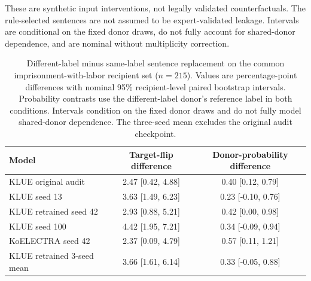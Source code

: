 These are synthetic input interventions, not legally validated
counterfactuals. The rule-selected sentences are not assumed to be
expert-validated leakage. Intervals are conditional on the fixed donor
draws, do not fully account for shared-donor dependence, and are nominal
without multiplicity correction.

\begin{table}[t]
\centering
\small
\begin{tabular}{lcc}
\hline
Model & Target-flip difference & Donor-probability difference \\
\hline
KLUE original audit & 2.47 [0.42, 4.88] & 0.40 [0.12, 0.79] \\
KLUE seed 13 & 3.63 [1.49, 6.23] & 0.23 [-0.10, 0.76] \\
KLUE retrained seed 42 & 2.93 [0.88, 5.21] & 0.42 [0.00, 0.98] \\
KLUE seed 100 & 4.42 [1.95, 7.21] & 0.34 [-0.09, 0.94] \\
KoELECTRA seed 42 & 2.37 [0.09, 4.79] & 0.57 [0.11, 1.21] \\
\hline
KLUE retrained 3-seed mean & 3.66 [1.61, 6.14] & 0.33 [-0.05, 0.88] \\
\hline
\end{tabular}
\caption{Different-label minus same-label sentence replacement on the common imprisonment-with-labor recipient set ($n=215$). Values are percentage-point differences with nominal 95\% recipient-level paired bootstrap intervals. Probability contrasts use the different-label donor's reference label in both conditions. Intervals condition on the fixed donor draws and do not fully model shared-donor dependence. The three-seed mean excludes the original audit checkpoint.}
\label{tab:cue-swap-imprisonment}
\end{table}
